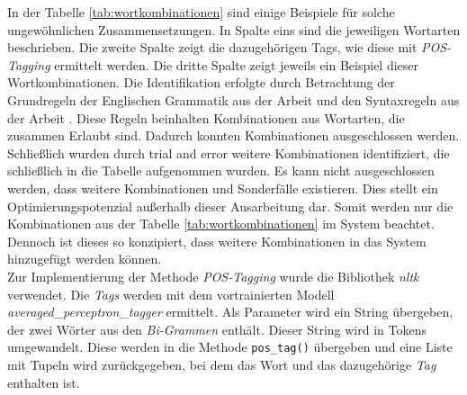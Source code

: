 In der Tabelle \ref{tab:wortkombinationen} sind einige Beispiele für solche ungewöhnlichen Zusammensetzungen. In Spalte eins sind die jeweiligen Wortarten beschrieben. Die zweite Spalte zeigt die dazugehörigen Tags, wie diese mit \emph{POS-Tagging} ermittelt werden. Die dritte Spalte zeigt jeweils ein Beispiel dieser Wortkombinationen. Die Identifikation erfolgte durch Betrachtung der Grundregeln der Englischen Grammatik aus der Arbeit \cite{ogden1930basic} und den Syntaxregeln aus der Arbeit \cite{tayal2014syntax}. Diese Regeln beinhalten Kombinationen aus Wortarten, die zusammen Erlaubt sind. Dadurch konnten Kombinationen ausgeschlossen werden. Schließlich wurden durch trial and error weitere Kombinationen identifiziert, die schließlich in die Tabelle aufgenommen wurden. Es kann nicht ausgeschlossen werden, dass weitere Kombinationen und Sonderfälle existieren. Dies stellt ein Optimierungspotenzial außerhalb dieser Ausarbeitung dar. Somit werden nur die Kombinationen aus der Tabelle \ref{tab:wortkombinationen} im System beachtet. Dennoch ist dieses so konzipiert, dass weitere Kombinationen in das System hinzugefügt werden können.\\

Zur Implementierung der Methode \emph{POS-Tagging} wurde die Bibliothek \emph{nltk} verwendet. Die \emph{Tags} werden mit dem vortrainierten Modell \emph{averaged\_perceptron\_tagger} ermittelt.
Als Parameter wird ein String übergeben, der zwei Wörter aus den \emph{Bi-Grammen} enthält. Dieser String wird in Tokens umgewandelt. Diese werden in die Methode \lstinline{pos_tag()}
übergeben und eine Liste mit Tupeln wird zurückgegeben, bei dem das Wort und das dazugehörige \emph{Tag} enthalten ist.

